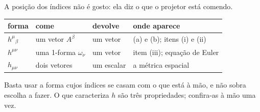 \documentclass[12pt,a4paper,oneside]{book}
\theoremstyle{rgplain}
\theoremstyle{rgremark}
\begin{document}
A posição dos índices não é gosto: ela diz o que o projetor está comendo.
\begin{center}
\small
\begin{tabular}{llll}
\toprule
forma & come & devolve & onde aparece \\
\midrule
$h^{\mu}{}_{\beta}$ & um vetor $A^{\beta}$ & um vetor
  & (a) e (b); itens (i) e (ii) \\
$h^{\mu\nu}$ & uma 1-forma $\omega_{\nu}$ & um vetor
  & item (iii); equação de Euler \\
$h_{\mu\nu}$ & dois vetores & um escalar & a métrica espacial \\
\bottomrule
\end{tabular}
\end{center}
Basta usar a forma cujos índices se casam com o que está à mão, e não sobra
escolha a fazer. O que caracteriza $h$ são três propriedades; confira-as à mão uma vez.
\end{document}
